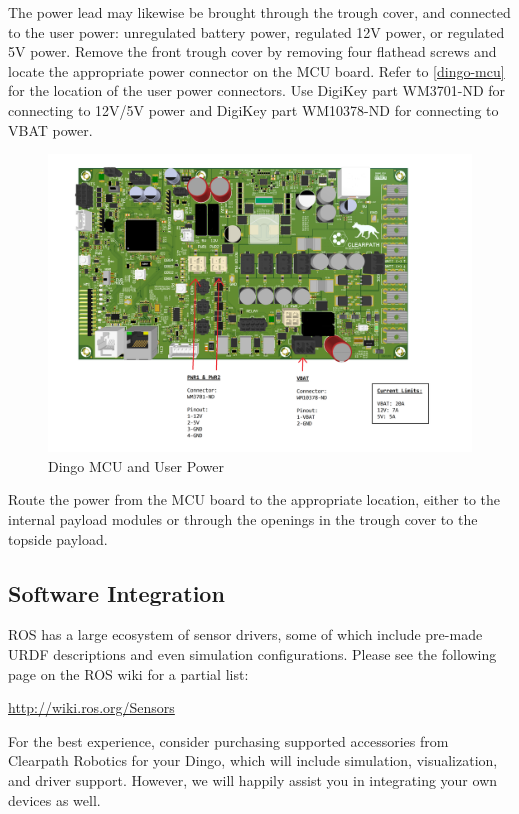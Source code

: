 \documentclass[]{clearpath-latex/clearpath-manual}
\begin{document}
The power lead may likewise be brought through the trough cover, and connected to the user power:
unregulated battery power, regulated 12V power, or regulated 5V power.
Remove the front trough cover by removing four flathead screws and locate the appropriate power
connector on the MCU board. Refer to \autoref{dingo-mcu} for the location of the user power connectors.
Use DigiKey part WM3701-ND for connecting to 12V/5V power and DigiKey part WM10378-ND for connecting to VBAT power.

\begin{figure}[H]
  \centering
  \includegraphics[width=0.9\linewidth]{dingo-mcu.png}
  \caption{Dingo MCU and User Power}
  \label{dingo-mcu}
\end{figure}

Route the power from the MCU board to the appropriate location, either to the internal payload modules or through the openings in the trough cover to the topside payload.

\subsection{Software Integration}

ROS has a large ecosystem of sensor drivers, some of which include pre-made URDF descriptions and
even simulation configurations. Please see the following page on the ROS wiki for a partial list:

\url{http://wiki.ros.org/Sensors}

For the best experience, consider purchasing supported accessories from Clearpath Robotics for your
Dingo, which will include simulation, visualization, and driver support. However, we will happily
assist you in integrating your own devices as well.
\end{document}
